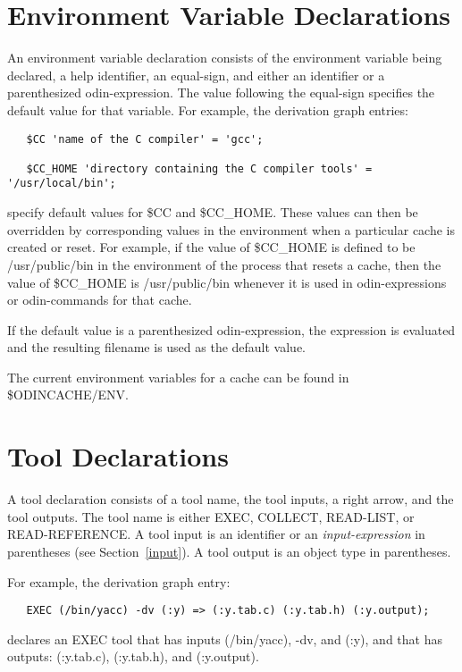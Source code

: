 \section{Environment Variable Declarations}
\label{envvardecl}

An environment variable declaration consists of
the environment variable being declared,
a help identifier, an equal-sign, and either an identifier
or a parenthesized odin-expression.
The value following the equal-sign specifies
the default value for that variable.
For example, the derivation graph entries:
\begin{verbatim}
   $CC 'name of the C compiler' = 'gcc';

   $CC_HOME 'directory containing the C compiler tools' = '/usr/local/bin';
\end{verbatim}
specify default values for {\ex \$CC} and {\ex \$CC\_HOME}.
These values can then be overridden by corresponding values in the
environment when a particular cache is created or reset.
For example, if the value of {\ex \$CC\_HOME} is defined to be
{\ex /usr/public/bin} in the environment of the process 
that resets a cache,
then the value of {\ex \$CC\_HOME} is {\ex /usr/public/bin}
whenever it is used in odin-expressions or odin-commands
for that cache.

If the default value is a parenthesized odin-expression,
the expression is evaluated and the resulting filename is used as
the default value.

The current environment variables for a cache can be found
in {\ex \$ODINCACHE/ENV}.


\section{Tool Declarations}
\label{execdecl}

A tool declaration consists of a tool name, the tool inputs,
a right arrow, and the tool outputs.
The tool name is either {\ex EXEC}, {\ex COLLECT}, {\ex READ-LIST},
or {\ex READ-REFERENCE}.
A tool input is an identifier
or an {\em input-expression} in parentheses (see Section~\ref{input}).
A tool output is an object type in parentheses.

For example, the derivation graph entry:
\begin{verbatim}
   EXEC (/bin/yacc) -dv (:y) => (:y.tab.c) (:y.tab.h) (:y.output);
\end{verbatim}
declares an {\ex EXEC} tool that has inputs
{\ex (/bin/yacc)}, {\ex -dv}, and {\ex (:y)},
and that has outputs:
{\ex (:y.tab.c)}, {\ex (:y.tab.h)}, and {\ex (:y.output)}.

